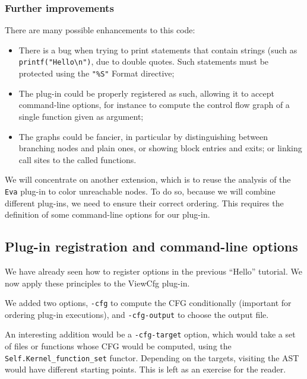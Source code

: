 \subsubsection*{Further improvements}

There are many possible enhancements to this code:

\begin{itemize}
\item There is a bug when trying to print statements that contain
  strings (such as \verb|printf("Hello\n")|, due to double quotes.
  Such statements must be protected using the \verb|"%S"| Format directive;
\item The plug-in could be properly registered as such, allowing it to
  accept command-line options, for instance to compute the control flow graph
  of a single function given as argument;
\item The graphs could be fancier, in particular by distinguishing
  between branching nodes and plain ones, or showing block entries and exits;
  or linking call sites to the called functions.
\end{itemize}

We will concentrate on another extension, which is to reuse the
analysis of the \texttt{Eva} plug-in to color unreachable nodes.
To do so, because we will combine different plug-ins, we need to ensure their
correct ordering. This requires the definition of some command-line options
for our plug-in.

\subsection{Plug-in registration and command-line options}\label{tut2:options}

We have already seen how to register options in the previous ``Hello'' tutorial.
We now apply these principles to the ViewCfg plug-in.


We added two options, \texttt{-cfg} to compute the CFG
conditionally (important for ordering plug-in executions),
and \texttt{-cfg-output} to choose the output file.

An interesting addition would be a \texttt{-cfg-target} option,
which would take a set of files or functions whose CFG would be
computed, using the \texttt{Self.Kernel\_function\_set} functor. Depending on
the targets, visiting the AST would have different starting points.
This is left as an exercise for the reader.

